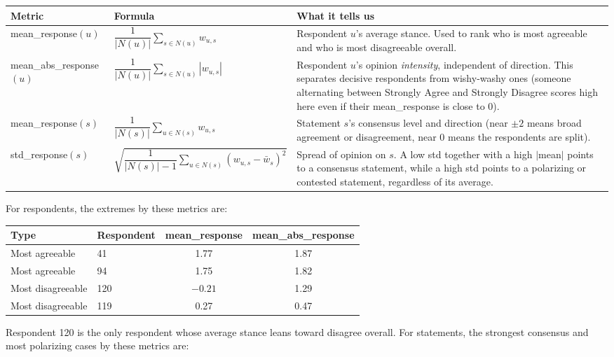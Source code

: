 \documentclass[11pt]{article}
\begin{document}
\begin{center}
\scriptsize
\begin{tabular}{p{2.9cm}p{4.6cm}p{6.1cm}}
\toprule
\textbf{Metric} & \textbf{Formula} & \textbf{What it tells us} \\
\midrule
mean\_response$(u)$ &
$\dfrac{1}{|N(u)|}\sum\limits_{s\in N(u)} w_{u,s}$ &
Respondent $u$'s average stance. Used to rank who is most agreeable and who is most disagreeable
overall. \\
\addlinespace
mean\_abs\_response$(u)$ &
$\dfrac{1}{|N(u)|}\sum\limits_{s\in N(u)} |w_{u,s}|$ &
Respondent $u$'s opinion \emph{intensity}, independent of direction. This separates decisive
respondents from wishy-washy ones (someone alternating between Strongly Agree and Strongly Disagree
scores high here even if their mean\_response is close to 0). \\
\addlinespace
mean\_response$(s)$ &
$\dfrac{1}{|N(s)|}\sum\limits_{u\in N(s)} w_{u,s}$ &
Statement $s$'s consensus level and direction (near $\pm2$ means broad agreement or disagreement,
near 0 means the respondents are split). \\
\addlinespace
std\_response$(s)$ &
$\sqrt{\dfrac{1}{|N(s)|-1}\sum\limits_{u\in N(s)} (w_{u,s}-\bar{w}_s)^2}$ &
Spread of opinion on $s$. A low std together with a high $|$mean$|$ points to a consensus statement,
while a high std points to a polarizing or contested statement, regardless of its average. \\
\bottomrule
\end{tabular}
\end{center}

For respondents, the extremes by these metrics are:

\begin{center}
\small
\begin{tabular}{llcc}
\toprule
\textbf{Type} & \textbf{Respondent} & \textbf{mean\_response} & \textbf{mean\_abs\_response} \\
\midrule
Most agreeable & 41 & 1.77 & 1.87 \\
Most agreeable & 94 & 1.75 & 1.82 \\
Most disagreeable & 120 & $-0.21$ & 1.29 \\
Most disagreeable & 119 & 0.27 & 0.47 \\
\bottomrule
\end{tabular}
\end{center}

Respondent 120 is the only respondent whose average stance leans toward disagree overall. For
statements, the strongest consensus and most polarizing cases by these metrics are:
\end{document}

